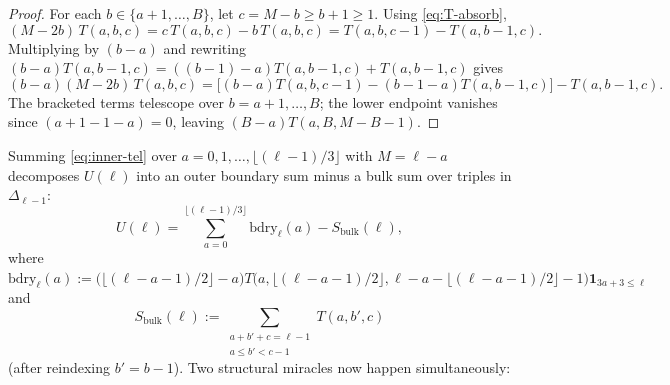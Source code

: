 \documentclass[11pt,a4paper]{article}
\numberwithin{equation}{section}
\theoremstyle{plain}
\theoremstyle{definition}
\theoremstyle{remark}
\begin{document}
\begin{proof}
For each $b\in\{a+1,\dots,B\}$, let $c=M-b\ge b+1\ge 1$. Using \eqref{eq:T-absorb},
\[
  (M-2b)\,T(a,b,c) = c\,T(a,b,c) - b\,T(a,b,c) = T(a,b,c-1) - T(a,b-1,c).
\]
Multiplying by $(b-a)$ and rewriting $(b-a)T(a,b-1,c)=((b-1)-a)T(a,b-1,c)+T(a,b-1,c)$ gives
\[
  (b-a)(M-2b)\,T(a,b,c)
  = \bigl[(b-a)T(a,b,c-1) - (b-1-a)T(a,b-1,c)\bigr] - T(a,b-1,c).
\]
The bracketed terms telescope over $b=a+1,\dots,B$; the lower endpoint vanishes since $(a+1-1-a)=0$, leaving $(B-a)T(a,B,M-B-1)$.
\end{proof}

Summing \eqref{eq:inner-tel} over $a=0,1,\dots,\lfloor(\ell-1)/3\rfloor$ with $M=\ell-a$ decomposes $U(\ell)$ into an outer boundary sum minus a bulk sum over triples in $\Delta_{\ell-1}$:
\[
  U(\ell) = \sum_{a=0}^{\lfloor(\ell-1)/3\rfloor} \mathrm{bdry}_\ell(a) - S_{\mathrm{bulk}}(\ell),
\]
where $\mathrm{bdry}_\ell(a) := \bigl(\lfloor(\ell-a-1)/2\rfloor-a\bigr)T\bigl(a,\lfloor(\ell-a-1)/2\rfloor,\ell-a-\lfloor(\ell-a-1)/2\rfloor-1\bigr)\mathbf{1}_{3a+3\le\ell}$ and
\[
  S_{\mathrm{bulk}}(\ell) := \sum_{\substack{a+b'+c=\ell-1\\ a\le b'<c-1}} T(a,b',c)
\]
(after reindexing $b'=b-1$). Two structural miracles now happen simultaneously:
\end{document}
